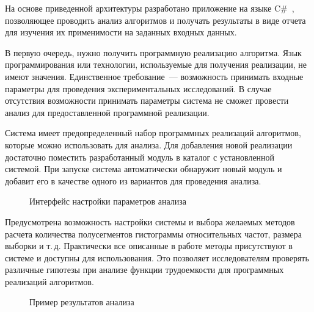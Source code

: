 \documentclass[a4paper, article, 14pt]{extarticle}
\begin{document}
На основе приведенной архитектуры разработано приложение на языке C\#~\cite{system_source}, позволяющее проводить анализ алгоритмов и получать результаты в виде отчета для изучения их применимости на заданных входных данных.

В первую очередь, нужно получить программную реализацию алгоритма. Язык программирования или технологии, используемые для получения реализации, не имеют значения. Единственное требование~--- возможность принимать входные параметры для проведения экспериментальных исследований. В случае отсутствия возможности принимать параметры система не сможет провести анализ для предоставленной программной реализации.

Система имеет предопределенный набор программных реализаций алгоритмов, которые можно использовать для анализа. Для добавления новой реализации достаточно поместить разработанный модуль в каталог с установленной системой. При запуске система автоматически обнаружит новый модуль и добавит его в качестве одного из вариантов для проведения анализа.

\begin{figure}[h]
	\caption{Интерфейс настройки параметров анализа}
	\label{fig:interface}
\end{figure}
\vskip6mm

Предусмотрена возможность настройки системы и выбора желаемых методов расчета количества полусегментов гистограммы относительных частот, размера выборки и т.\,д. Практически все описанные в работе методы присутствуют в системе и доступны для использования. Это позволяет исследователям проверять различные гипотезы при анализе функции трудоемкости для программных реализаций алгоритмов.

\begin{figure}[h]
	\caption{Пример результатов анализа}
	\label{fig:results}
\end{figure}
\vskip5mm
\end{document}
